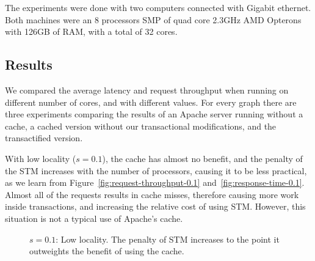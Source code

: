 \documentclass[preprint,11pt]{sigplanconf}
\begin{document}
The experiments were done with two computers connected with Gigabit ethernet.
Both machines were an 8 processors SMP of quad core 2.3GHz AMD Opterons 
with 126GB of RAM, with a total of 32 cores. 

\subsection{Results} 
We compared the average latency and request throughput when running on different
number of cores, and with different  values. For every graph there are three
experiments comparing the results of an Apache server running without a cache, a
cached version without our transactional modifications, and the transactified
version. 

With low locality ($s=0.1$), the cache has almost no benefit, and the penalty of
the STM increases with the number of processors, causing it to be less
practical, as we learn from Figure~\ref{fig:request-throughput-0.1}
and~\ref{fig:response-time-0.1}. Almost all of the requests results in cache
misses, therefore causing more work inside transactions, and increasing the
relative cost of using STM. However, this situation is not a typical use of
Apache's cache.

\begin{figure}
 \centering
 \hfill
 \caption{$s = 0.1$: Low locality. The penalty of STM increases to the point it
    outweights the benefit of using the cache.}
\end{figure}
\end{document}
